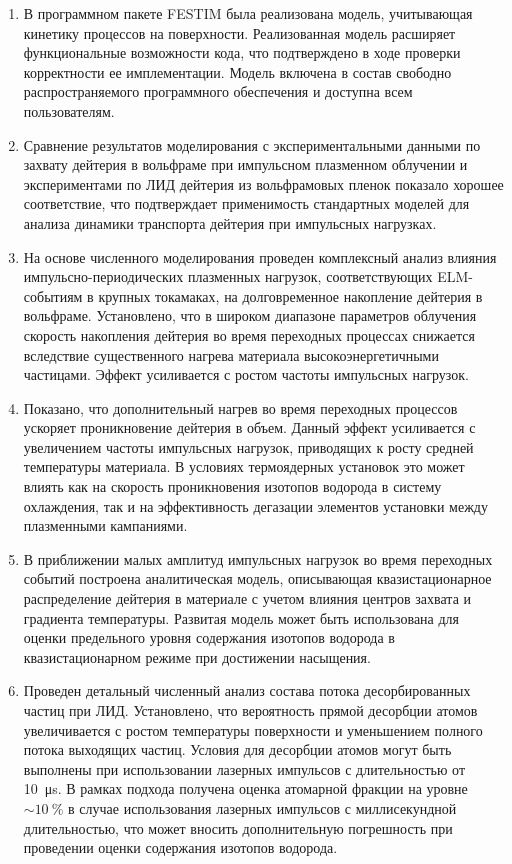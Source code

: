 \begin{enumerate}
  \item В программном пакете FESTIM была реализована модель, учитывающая кинетику процессов на поверхности. Реализованная модель расширяет функциональные возможности кода, что подтверждено в ходе проверки корректности ее имплементации. Модель включена в состав свободно распространяемого программного обеспечения и доступна всем пользователям.
  \item Сравнение результатов моделирования с экспериментальными данными по захвату дейтерия в вольфраме при импульсном плазменном облучении и экспериментами по ЛИД дейтерия из вольфрамовых пленок показало хорошее соответствие, что подтверждает применимость стандартных моделей для анализа динамики транспорта дейтерия при импульсных нагрузках.
  \item На основе численного моделирования проведен комплексный анализ влияния импульсно-периодических плазменных нагрузок, соответствующих ELM-событиям в крупных токамаках, на долговременное накопление дейтерия в вольфраме. Установлено, что в широком диапазоне параметров облучения скорость накопления дейтерия во время переходных процессах снижается вследствие существенного нагрева материала высокоэнергетичными частицами. Эффект усиливается с ростом частоты импульсных нагрузок. 
  \item Показано, что дополнительный нагрев во время переходных процессов ускоряет проникновение дейтерия в объем. Данный эффект усиливается с увеличением частоты импульсных нагрузок, приводящих к росту средней температуры материала. В условиях термоядерных установок это может влиять как на скорость проникновения изотопов водорода в систему охлаждения, так и на эффективность дегазации элементов установки между плазменными кампаниями.
  \item В приближении малых амплитуд импульсных нагрузок во время переходных событий построена аналитическая модель, описывающая квазистационарное распределение дейтерия в материале с учетом влияния центров захвата и градиента температуры. Развитая модель может быть использована для оценки предельного уровня содержания изотопов водорода в квазистационарном режиме при достижении насыщения.
  \item Проведен детальный численный анализ состава потока десорбированных частиц при ЛИД. Установлено, что вероятность прямой десорбции атомов увеличивается с ростом температуры поверхности и уменьшением полного потока выходящих частиц. Условия для десорбции атомов могут быть выполнены при использовании лазерных импульсов с длительностью от \SI{10}{\micro\second}. В рамках подхода получена оценка атомарной фракции на уровне \( \sim \SI{10}{\percent} \) в случае использования лазерных импульсов с миллисекундной длительностью, что может вносить дополнительную погрешность при проведении оценки содержания изотопов водорода.

\end{enumerate}

